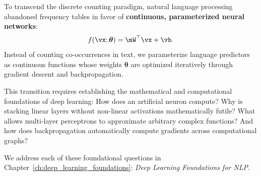 \documentclass[../../main.tex]{subfiles}
\begin{document}
To transcend the discrete counting paradigm, natural language processing abandoned frequency tables in favor of \textbf{continuous, parameterized neural networks}:
\[
f(\vx; \bm{\theta}) = \mW^\top \vx + \vb.
\]
Instead of counting co-occurrences in text, we parameterize language predictors as continuous functions whose weights $\bm{\theta}$ are optimized iteratively through gradient descent and backpropagation. 

This transition requires establishing the mathematical and computational foundations of deep learning: How does an artificial neuron compute? Why is stacking linear layers without non-linear activations mathematically futile? What allows multi-layer perceptrons to approximate arbitrary complex functions? And how does backpropagation automatically compute gradients across computational graphs?

We address each of these foundational questions in Chapter~\ref{ch:deep_learning_foundations}: \emph{Deep Learning Foundations for NLP}.
\end{document}
